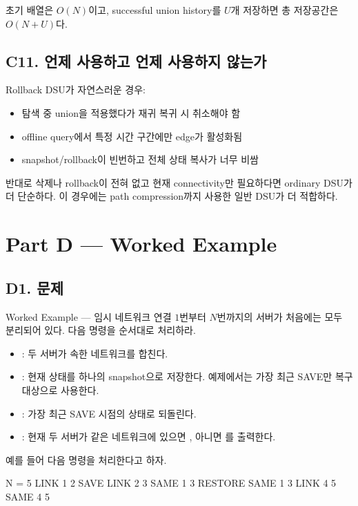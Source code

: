 초기 배열은 $O(N)$이고, successful union history를 $U$개 저장하면 총 저장공간은 $O(N+U)$다.

\subsection{C11. 언제 사용하고 언제 사용하지 않는가}
Rollback DSU가 자연스러운 경우:
\begin{itemize}
\item 탐색 중 union을 적용했다가 재귀 복귀 시 취소해야 함
\item offline query에서 특정 시간 구간에만 edge가 활성화됨
\item snapshot/rollback이 빈번하고 전체 상태 복사가 너무 비쌈
\end{itemize}

반대로 삭제나 rollback이 전혀 없고 현재 connectivity만 필요하다면 ordinary DSU가 더 단순하다. 이 경우에는 path compression까지 사용한 일반 DSU가 더 적합하다.

\section{Part D --- Worked Example}

\subsection*{D1. 문제}
\begin{problembox}{Worked Example --- 임시 네트워크 연결}
$1$번부터 $N$번까지의 서버가 처음에는 모두 분리되어 있다. 다음 명령을 순서대로 처리하라.
\begin{itemize}
\item {}: 두 서버가 속한 네트워크를 합친다.
\item {}: 현재 상태를 하나의 snapshot으로 저장한다. 예제에서는 가장 최근 SAVE만 복구 대상으로 사용한다.
\item {}: 가장 최근 SAVE 시점의 상태로 되돌린다.
\item {}: 현재 두 서버가 같은 네트워크에 있으면 , 아니면 를 출력한다.
\end{itemize}
\end{problembox}

예를 들어 다음 명령을 처리한다고 하자.
\begin{TextBlock}
N = 5
LINK 1 2
SAVE
LINK 2 3
SAME 1 3
RESTORE
SAME 1 3
LINK 4 5
SAME 4 5
\end{TextBlock}

